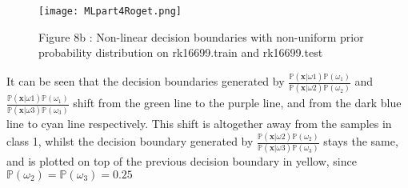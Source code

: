                                                                                                                         \begin{wrapfigure}{}{\textwidth}
                                                                                                                          \begin{center}
                                                                                                                              \texttt{[image: MLpart4Roget.png]}
                                                                                                                                  \caption{Figure 8b : Non-linear decision boundaries with non-uniform prior probability distribution on rk16699.train and rk16699.test}
                                                                                                                                  \end{center}
                                                                                                                                  \end{wrapfigure}

                                                                                                                                  It can be seen that the decision boundaries generated by $\frac{\mathbb{P}(\bm{x} | \omega{1}) \mathbb{P}( \omega_{1}) }{\mathbb{P}(\bm{x} | \omega{2})\mathbb{P}( \omega_{2}) }$ and $\frac{\mathbb{P}(\bm{x} | \omega{1}) \mathbb{P}( \omega_{1}) }{\mathbb{P}(\bm{x} | \omega{3})\mathbb{P}( \omega_{3}) }$ shift from the green line to the purple
                                                                                                                                  line, and from the dark blue line to cyan line respectively. This shift is altogether away from the samples in class 1, whilst the decision boundary generated by $\frac{\mathbb{P}(\bm{x} | \omega{2}) \mathbb{P}( \omega_{2}) }{\mathbb{P}(\bm{x} | \omega{3})\mathbb{P}( \omega_{3}) }$ stays the same, and is plotted on top of the previous decision boundary in
                                                                                                                                  yellow, since $\mathbb{P}( \omega_{2}) = \mathbb{P}( \omega_{3}) = 0.25$


